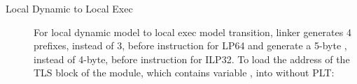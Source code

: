 \begin{description}
\item[Local Dynamic to Local Exec]
For local dynamic model to local exec model transition, linker generates
4  prefixes, instead of 3, before  instruction
for LP64 and generate a 5-byte , instead of 4-byte, before
 instruction for ILP32.  To load the address of the TLS block
of the module, which contains variable , into  without
PLT:

\begin{table}[H]
\Hrule
\caption{LD -> LE Code Transition (LP64)}
\begin{center}
\myfontsize{}
\end{center}
\Hrule
\end{table}

\begin{table}[H]
\Hrule
\caption{LD -> LE Code Transition (ILP32)}
\begin{center}
\myfontsize{}
\end{center}
\Hrule
\end{table}

\end{description}
